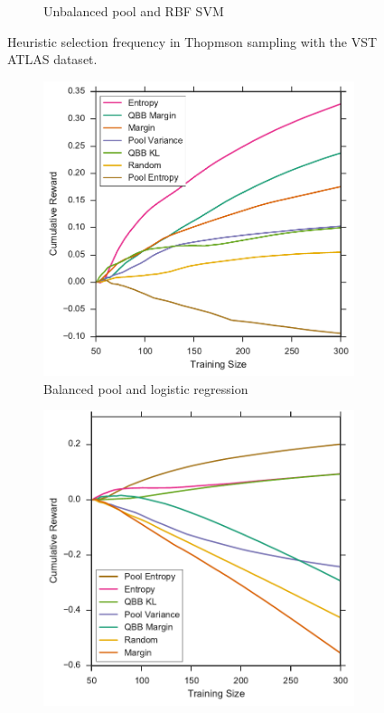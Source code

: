 \begin{figure}[p]
\begin{subfigure}{.5\textwidth}
		\caption{Unbalanced pool and RBF SVM}
		\label{fig:vstatlas_ur_frequencies}
	\end{subfigure}
	\caption[Heuristic selection frequency (VST ATLAS)]{
		Heuristic selection frequency in Thopmson sampling with the VST ATLAS dataset.}
	\label{fig:vstatlas_frequencies}
\end{figure}


\begin{figure}[p]
	\centering
	\begin{subfigure}{.5\textwidth}
		\centering
		\includegraphics[width=\textwidth]{figures/5_thompson/vstatlas_bl_sum_rewards}
		\caption{Balanced pool and logistic regression}
		\label{fig:vstatlas_bl_sum_rewards}
	\end{subfigure}%
	\begin{subfigure}{.5\textwidth}
		\centering
		\includegraphics[width=\linewidth]{figures/5_thompson/vstatlas_br_sum_rewards}

\end{subfigure}
\end{figure}
